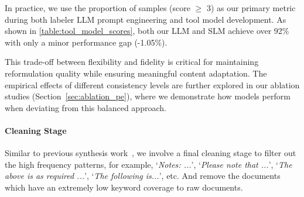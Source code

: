 In practice, we use the proportion of samples (score $\ge$ 3) as our primary metric during both labeler LLM prompt engineering and tool model development. 
As shown in \autoref{table:tool_model_scores}, both our LLM and SLM achieve over 92\% with only a minor performance gap (-1.05\%).

\begin{table*}[h]
    \vspace{-1em}
    \centering
    \caption{Performance comparison between SLM and LLM on reformulation quality evaluation.}
    \begin{adjustbox}{max width=\textwidth}
    \end{adjustbox}
\label{table:tool_model_scores}
\end{table*}

This trade-off between flexibility and fidelity is critical for maintaining reformulation quality while ensuring meaningful content adaptation. The empirical effects of different consistency levels are further explored in our ablation studies (Section~\ref{sec:ablation_pe}), where we demonstrate how models perform when deviating from this balanced approach.
\paragraph{Cleaning Stage}
Similar to previous synthesis work~\citep{maini2024rephrasing,su2024nemotron}, we involve a final cleaning stage to filter out the high frequency patterns, for example,
`\textit{Notes: ...}', `\textit{Please note that ...}', `\textit{The above is as required ...}', `\textit{The following is...}', etc.
And remove the documents which have an extremely low keyword coverage to raw documents.
